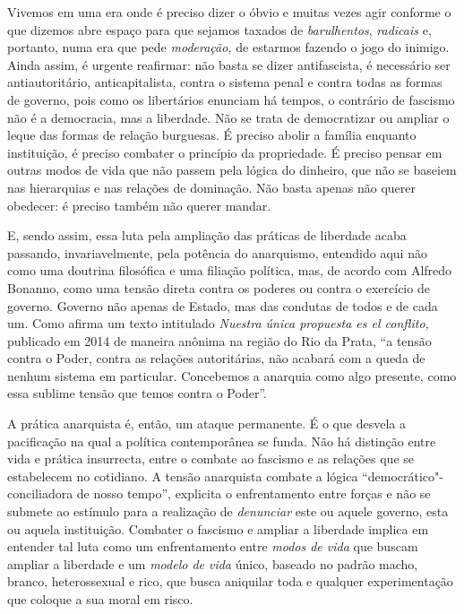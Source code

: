 Vivemos em uma era onde é preciso dizer o óbvio e muitas vezes agir
conforme o que dizemos abre espaço para que sejamos taxados de
\emph{barulhentos}, \emph{radicais} e, portanto, numa era que pede
\emph{moderação,} de estarmos fazendo o jogo do inimigo. Ainda assim, é
urgente reafirmar: não basta se dizer antifascista, é necessário ser
antiautoritário, anticapitalista, contra o sistema penal e contra todas
as formas de governo, pois como os libertários enunciam há tempos, o
contrário de fascismo não é a democracia, mas a liberdade. Não se trata
de democratizar ou ampliar o leque das formas de relação burguesas. É
preciso abolir a família enquanto instituição, é preciso combater o
princípio da propriedade. É preciso pensar em outras modos de vida que
não passem pela lógica do dinheiro, que não se baseiem nas hierarquias e
nas relações de dominação. Não basta apenas não querer obedecer: é
preciso também não querer mandar.

E, sendo assim, essa luta pela ampliação das práticas de liberdade acaba
passando, invariavelmente, pela potência do anarquismo, entendido aqui
não como uma doutrina filosófica e uma filiação política, mas, de acordo
com Alfredo Bonanno, como uma tensão direta contra os poderes ou contra
o exercício de governo. Governo não apenas de Estado, mas das condutas
de todos e de cada um. Como afirma um texto intitulado \emph{Nuestra
única propuesta es el conflito,} publicado em 2014 de maneira anônima na
região do Rio da Prata, ``a tensão contra o Poder, contra as relações
autoritárias, não acabará com a queda de nenhum sistema em particular.
Concebemos a anarquia como algo presente, como essa sublime tensão que
temos contra o Poder''.

A prática anarquista é, então, um ataque permanente. É o que desvela a
pacificação na qual a política contemporânea se funda. Não há distinção
entre vida e prática insurrecta, entre o combate ao fascismo e as
relações que se estabelecem no cotidiano. A tensão anarquista combate a
lógica ``democrático"-conciliadora de nosso tempo'', explicita o
enfrentamento entre forças e não se submete ao estímulo para a
realização de \emph{denunciar} este ou aquele governo, esta ou aquela
instituição. Combater o fascismo e ampliar a liberdade implica em
entender tal luta como um enfrentamento entre \emph{modos de vida} que
buscam ampliar a liberdade e um \emph{modelo de vida} único, baseado no
padrão macho, branco, heterossexual e rico, que busca aniquilar toda e
qualquer experimentação que coloque a sua moral em risco.

